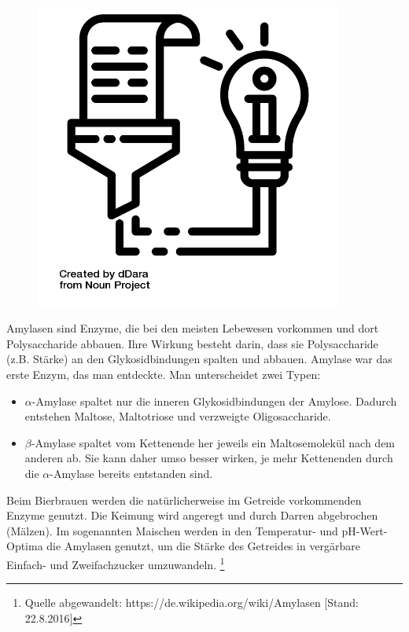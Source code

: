 \documentclass{scrartcl}  %
\begin{document}
			\begin{tcolorbox}[enhanced,
				colback=white,
				colframe=darkgray,
				fonttitle=\sffamily\bfseries\large, 
				title=Amylasen,  %
				attach boxed title to top left={xshift=3.2mm,yshift=-0.50mm},
				boxed title style={skin=enhancedfirst jigsaw,size=small,arc=1mm,bottom=-1mm,colframe=darkgray,height=0.75cm},
				colbacktitle=darkgray,
				drop lifted shadow]
				\begin{figure}  
					\centering
					\vspace{-14pt}  %
					\includegraphics[width=0.9\textwidth]{symbols/symbol_tex_content}
				\end{figure}
				
				Amylasen sind Enzyme, die bei den meisten Lebewesen vorkommen und dort Polysaccharide abbauen. Ihre Wirkung besteht darin, dass sie Polysaccharide (z.B. Stärke) an den Glykosidbindungen spalten und abbauen. Amylase war das erste Enzym, das man entdeckte. Man unterscheidet zwei Typen:
				\begin{itemize}
					\item $\alpha$-Amylase spaltet nur die inneren Glykosidbindungen der Amylose. Dadurch entstehen Maltose, Maltotriose und verzweigte Oligosaccharide.
				    \item $\beta$-Amylase spaltet vom Kettenende her jeweils ein Maltosemolekül nach dem anderen ab. Sie kann daher umso besser wirken, je mehr Kettenenden durch die $\alpha$-Amylase bereits entstanden sind.
				\end{itemize}
				Beim Bierbrauen werden die natürlicherweise im Getreide vorkommenden Enzyme genutzt. Die Keimung wird angeregt und durch Darren abgebrochen (Mälzen). Im sogenannten Maischen werden in den Temperatur- und pH-Wert-Optima die Amylasen genutzt, um die Stärke des Getreides in vergärbare Einfach- und Zweifachzucker umzuwandeln.
				\footnote{Quelle abgewandelt: https://de.wikipedia.org/wiki/Amylasen [Stand: 22.8.2016]}
			\end{tcolorbox}
\end{document}
